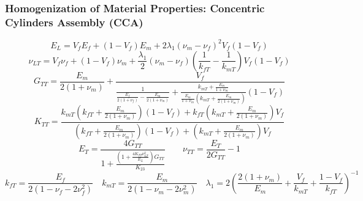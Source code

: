 \documentclass[first,firstsupp,lastsupp,last,hyperref,table]{ETHclass}
\begin{document}
\begin{frame}
\frametitle{\vspace{0.35cm}\footnotesize Homogenization of Material Properties: Concentric Cylinders Assembly (CCA)}
\vspace{-0.75cm}
\centering
\tiny
\begin{equation*}
E_{L}=V_{f}E_{f}+\left(1-V_{f}\right)E_{m}+2\lambda_{1}\left(\nu_{m}-\nu_{f}\right)^{2}V_{f}\left(1-V_{f}\right)
\end{equation*}
\begin{equation*}
\nu_{LT}=V_{f}\nu_{f}+\left(1-V_{f}\right)\nu_{m}+\frac{\lambda_{1}}{2}\left(\nu_{m}-\nu_{f}\right)\left(\frac{1}{k_{fT}}-\frac{1}{k_{mT}}\right)V_{f}\left(1-V_{f}\right)
\end{equation*}
\begin{equation*}
G_{TT}=\frac{E_{m}}{2\left(1+\nu_{m}\right)}+\frac{V_{f}}{\frac{1}{\frac{E_{f}}{2\left(1+\nu_{f}\right)}-\frac{E_{m}}{2\left(1+\nu_{m}\right)}}+\frac{k_{mT}+\frac{E_{m}}{1+\nu_{m}}}{\frac{E_{m}}{1+\nu_{m}}\left(k_{mT}+\frac{E_{m}}{2\left(1+\nu_{m}\right)}\right)}\left(1-V_{f}\right)}
\end{equation*}
\begin{equation*}
K_{TT}=\frac{k_{mT}\left(k_{fT}+\frac{E_{m}}{2\left(1+\nu_{m}\right)}\right)\left(1-V_{f}\right)+k_{fT}\left(k_{mT}+\frac{E_{m}}{2\left(1+\nu_{m}\right)}\right)V_{f}}{\left(k_{fT}+\frac{E_{m}}{2\left(1+\nu_{m}\right)}\right)\left(1-V_{f}\right)+\left(k_{mT}+\frac{E_{m}}{2\left(1+\nu_{m}\right)}\right)V_{f}}
\end{equation*}
\begin{equation*}
E_{T}=\frac{4G_{TT}}{1+\frac{\left(1+\frac{4K_{TT}\nu_{LT}^{2}}{E_{L}}\right)G_{TT}}{K_{23}}}\qquad\nu_{TT}=\frac{E_{T}}{2G_{TT}}-1
\end{equation*}
\begin{equation*}
k_{fT}=\frac{E_{f}}{2\left(1-\nu_{f}-2\nu_{f}^{2}\right)}\quad k_{mT}=\frac{E_{m}}{2\left(1-\nu_{m}-2\nu_{m}^{2}\right)}\quad\lambda_{1}=2\left(\frac{2\left(1+\nu_{m}\right)}{E_{m}}+\frac{V_{f}}{k_{mT}}+\frac{1-V_{f}}{k_{fT}}\right)^{-1}
\end{equation*}
\end{frame}
\end{document}
